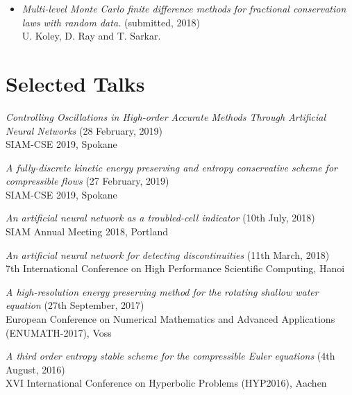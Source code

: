 \documentclass[margin]{res}
\begin{document}
\begin{resume}
\begin{itemize}
              \item {\it Multi-level Monte Carlo finite difference methods for fractional conservation laws with random data.} (submitted, 2018)\\
              U. Koley, D. Ray and T. Sarkar.

             \end{itemize}

             
\section{Selected Talks}

             {\it Controlling Oscillations in High-order Accurate Methods Through Artificial Neural Networks} (28 February, 2019)\\
              SIAM-CSE 2019, Spokane
              
              {\it A fully-discrete kinetic energy preserving and entropy conservative scheme for compressible flows} (27 February, 2019)\\
              SIAM-CSE 2019, Spokane
             
              {\it An artificial neural network as a troubled-cell indicator} (10th July, 2018)\\
              SIAM Annual Meeting 2018, Portland
              
              {\it An artificial neural network for detecting discontinuities} (11th March, 2018)\\
              7th International Conference on High Performance Scientific Computing, Hanoi 
              
              {\it A high-resolution energy preserving method for the rotating shallow water equation} (27th September, 2017)\\
               European Conference on Numerical Mathematics and Advanced Applications (ENUMATH-2017), Voss
              
              {\it A third order entropy stable scheme for the compressible Euler equations} (4th August, 2016)\\
               XVI International Conference on Hyperbolic Problems (HYP2016), Aachen 
              
              

\end{resume}
\end{document}
